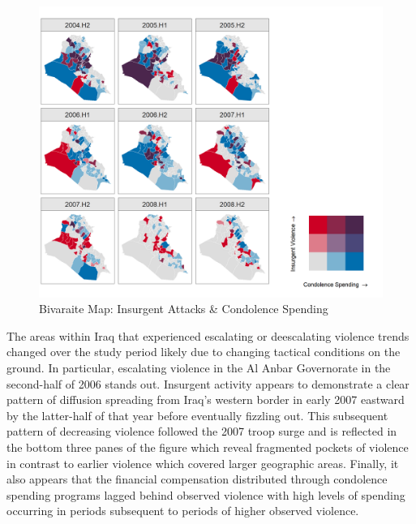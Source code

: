 \documentclass[12pt]{article}
\begin{document}
\begin{figure}[!h]
  \centering
  \includegraphics{figure-bimap.png}
  \caption{Bivaraite Map: Insurgent Attacks \& Condolence Spending}
  \label{figure:map_attacks}
\end{figure}

The areas within Iraq that experienced escalating or deescalating violence trends changed over the study period likely due to changing tactical conditions on the ground. In particular, escalating violence in the Al Anbar Governorate in the second-half of 2006 stands out. Insurgent activity appears to demonstrate a clear pattern of diffusion spreading from Iraq's western border in early 2007 eastward by the latter-half of that year before eventually fizzling out. This subsequent pattern of decreasing violence followed the 2007 troop surge and is reflected in the bottom three panes of the figure which reveal fragmented pockets of violence in contrast to earlier violence which covered larger geographic areas. Finally, it also appears that the financial compensation distributed through condolence spending programs lagged behind observed violence with high levels of spending occurring in periods subsequent to periods of higher observed violence.
\end{document}
